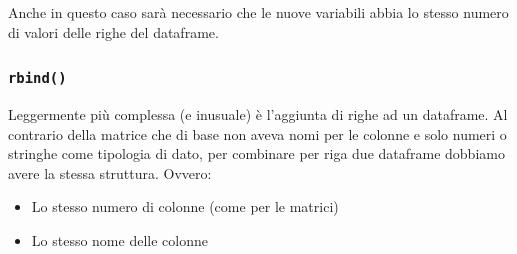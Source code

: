 \documentclass[
]{book}
\providecommand{\tightlist}{%
  \setlength{\itemsep}{0pt}\setlength{\parskip}{0pt}}
\begin{document}
Anche in questo caso sarà necessario che le nuove variabili abbia lo stesso numero di valori delle righe del dataframe.

\hypertarget{rbind}{%
\subsubsection*{\texorpdfstring{\texttt{rbind()}}{rbind()}}\label{rbind}}

Leggermente più complessa (e inusuale) è l'aggiunta di righe ad un dataframe. Al contrario della matrice che di base non aveva nomi per le colonne e solo numeri o stringhe come tipologia di dato, per combinare per riga due dataframe dobbiamo avere la stessa struttura. Ovvero:

\begin{itemize}
\tightlist
\item
  Lo stesso numero di colonne (come per le matrici)
\item
  Lo stesso nome delle colonne
\end{itemize}
\end{document}
